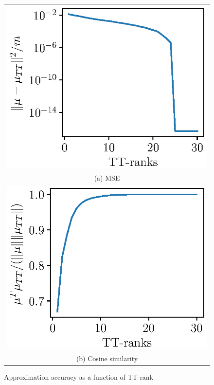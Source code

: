 \begin{figure}[!h]
  \vspace{-.3cm}
  \begin{center}
      \begin{tabular}{c}
          \includegraphics[width=0.95\linewidth]{pics/acc_vs_ranks.eps} \\
          (a) MSE\\  
          \includegraphics[width=0.95\linewidth]{pics/cos_vs_ranks.eps} \\
          (b) Cosine similarity
      \end{tabular}
  \end{center}
  \caption{Approximation accuracy as a function of TT-rank}
  \label{acc_vs_ranks}
\end{figure}

